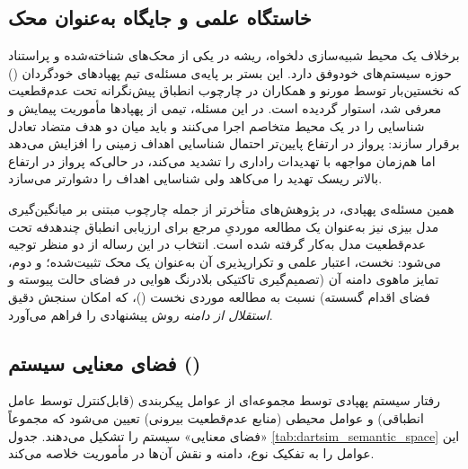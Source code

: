 \documentclass[oneside,openany,phd]{TMU-Thesis}
\begin{document}
\subsection{خاستگاه علمی و جایگاه به‌عنوان محک}
\label{subsec:dartsim_origin}

برخلاف یک محیط شبیه‌سازی دلخواه،  ریشه در یکی از محک‌های شناخته‌شده و پراستناد حوزه سیستم‌های خودوفق دارد. این بستر بر پایه‌ی مسئله‌ی تیم پهپادهای خودگردان () که نخستین‌بار توسط مورنو و همکاران \cite{moreno2015proactive} در چارچوب انطباق پیش‌نگرانه تحت عدم‌قطعیت معرفی شد، استوار گردیده است. در این مسئله، تیمی از پهپادها مأموریت پیمایش و شناسایی را در یک محیط متخاصم اجرا می‌کنند و باید میان دو هدف متضاد تعادل برقرار سازند: پرواز در ارتفاع پایین‌تر احتمال شناسایی اهداف زمینی را افزایش می‌دهد اما هم‌زمان مواجهه با تهدیدات راداری را تشدید می‌کند، در حالی‌که پرواز در ارتفاع بالاتر ریسک تهدید را می‌کاهد ولی شناسایی اهداف را دشوارتر می‌سازد.

همین مسئله‌ی پهپادی، در پژوهش‌های متأخرتر از جمله چارچوب  مبتنی بر میانگین‌گیری مدل بیزی \cite{camilli2025manyobjective} نیز به‌عنوان یک مطالعه موردیِ مرجع برای ارزیابی انطباق چندهدفه تحت عدم‌قطعیت مدل به‌کار گرفته شده است. انتخاب  در این رساله از دو منظر توجیه می‌شود: نخست، اعتبار علمی و تکرارپذیری آن به‌عنوان یک محک تثبیت‌شده؛ و دوم، تمایز ماهوی دامنه آن (تصمیم‌گیری تاکتیکی بلادرنگ هوایی در فضای حالت پیوسته و فضای اقدام گسسته) نسبت به مطالعه موردی نخست ()، که امکان سنجش دقیق \emph{استقلال از دامنه} روش پیشنهادی را فراهم می‌آورد.

\subsection{فضای معنایی سیستم ()}
\label{subsec:dartsim_semantic}

رفتار سیستم پهپادی توسط مجموعه‌ای از عوامل پیکربندی (قابل‌کنترل توسط عامل انطباقی) و عوامل محیطی (منابع عدم‌قطعیت بیرونی) تعیین می‌شود که مجموعاً «فضای معنایی» سیستم را تشکیل می‌دهند. جدول \ref{tab:dartsim_semantic_space} این عوامل را به تفکیک نوع، دامنه و نقش آن‌ها در مأموریت خلاصه می‌کند.
\end{document}
